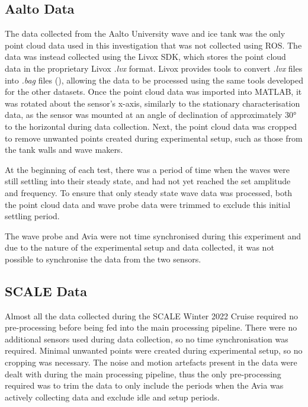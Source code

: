 \subsection{Aalto Data}
\label{subsec:ch5.section1.subsec3}

The data collected from the Aalto University wave and ice tank was the only point cloud data used in this investigation that was not collected using \ac{ROS}. The data was instead collected using the Livox SDK, which stores the point cloud data in the proprietary Livox \emph{.lvx} format. Livox provides tools to convert \emph{.lvx} files into \emph{.bag} files (\cite{livoxLivoxSDKLivox_ros_driver2025}), allowing the data to be processed using the same tools developed for the other datasets. Once the point cloud data was imported into MATLAB, it was rotated about the sensor's x-axis, similarly to the stationary characterisation data, as the sensor was mounted at an angle of declination of approximately 30° to the horizontal during data collection. Next, the point cloud data was cropped to remove unwanted points created during experimental setup, such as those from the tank walls and wave makers.

At the beginning of each test, there was a period of time when the waves were still settling into their steady state, and had not yet reached the set amplitude and frequency. To ensure that only steady state wave data was processed, both the point cloud data and wave probe data were trimmed to exclude this initial settling period.

The wave probe and Avia were not time synchronised during this experiment and due to the nature of the experimental setup and data collected, it was not possible to synchronise the data from the two sensors.

\subsection{SCALE Data}
\label{subsec:ch5.section1.subsec4}

Almost all the data collected during the \ac{SCALE} Winter 2022 Cruise required no pre-processing before being fed into the main processing pipeline. There were no additional sensors used during data collection, so no time synchronisation was required. Minimal unwanted points were created during experimental setup, so no cropping was necessary. The noise and motion artefacts present in the data were dealt with during the main processing pipeline, thus the only pre-processing required was to trim the data to only include the periods when the Avia was actively collecting data and exclude idle and setup periods.

